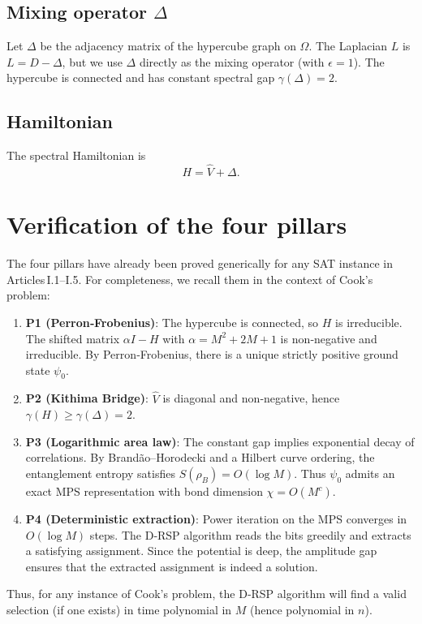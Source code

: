 \documentclass[11pt,a4paper]{article}
\begin{document}
\subsection{Mixing operator \(\Delta\)}
Let \(\Delta\) be the adjacency matrix of the hypercube graph on \(\Omega\). The Laplacian \(L\) is \(L = D - \Delta\), but we use \(\Delta\) directly as the mixing operator (with \(\epsilon = 1\)). The hypercube is connected and has constant spectral gap \(\gamma(\Delta) = 2\).

\subsection{Hamiltonian}
The spectral Hamiltonian is
\[
H = \hat{V} + \Delta.
\]

\section{Verification of the four pillars}

The four pillars have already been proved generically for any SAT instance in Articles I.1–I.5. For completeness, we recall them in the context of Cook's problem:

\begin{enumerate}
\item \textbf{P1 (Perron‑Frobenius)}: The hypercube is connected, so \(H\) is irreducible. The shifted matrix \(\alpha I - H\) with \(\alpha = M^2+2M+1\) is non‑negative and irreducible. By Perron‑Frobenius, there is a unique strictly positive ground state \(\psi_0\).
\item \textbf{P2 (Kithima Bridge)}: \(\hat{V}\) is diagonal and non‑negative, hence \(\gamma(H) \ge \gamma(\Delta) = 2\).
\item \textbf{P3 (Logarithmic area law)}: The constant gap implies exponential decay of correlations. By Brandão–Horodecki and a Hilbert curve ordering, the entanglement entropy satisfies \(S(\rho_B) = O(\log M)\). Thus \(\psi_0\) admits an exact MPS representation with bond dimension \(\chi = O(M^c)\).
\item \textbf{P4 (Deterministic extraction)}: Power iteration on the MPS converges in \(O(\log M)\) steps. The D‑RSP algorithm reads the bits greedily and extracts a satisfying assignment. Since the potential is deep, the amplitude gap ensures that the extracted assignment is indeed a solution.
\end{enumerate}

Thus, for any instance of Cook's problem, the D‑RSP algorithm will find a valid selection (if one exists) in time polynomial in \(M\) (hence polynomial in \(n\)).
\end{document}
